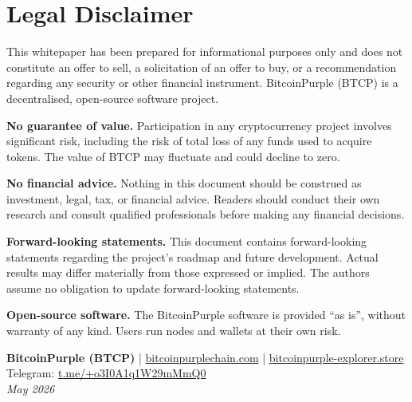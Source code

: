 \documentclass[12pt, a4paper]{article}
\begin{document}
\section{Legal Disclaimer}

This whitepaper has been prepared for informational purposes only and does not
constitute an offer to sell, a solicitation of an offer to buy, or a
recommendation regarding any security or other financial instrument.
BitcoinPurple (BTCP) is a decentralised, open-source software project.

\textbf{No guarantee of value.}  Participation in any cryptocurrency project
involves significant risk, including the risk of total loss of any funds used
to acquire tokens.  The value of BTCP may fluctuate and could decline to zero.

\textbf{No financial advice.}  Nothing in this document should be construed as
investment, legal, tax, or financial advice.  Readers should conduct their own
research and consult qualified professionals before making any financial
decisions.

\textbf{Forward-looking statements.}  This document contains forward-looking
statements regarding the project's roadmap and future development.  Actual
results may differ materially from those expressed or implied.  The authors
assume no obligation to update forward-looking statements.

\textbf{Open-source software.}  The BitcoinPurple software is provided ``as
is'', without warranty of any kind.  Users run nodes and wallets at their own
risk.

\vfill
\begin{center}
{\small
\textbf{BitcoinPurple (BTCP)} \quad|\quad
\href{https://bitcoinpurplechain.com/}{bitcoinpurplechain.com} \quad|\quad
\href{https://bitcoinpurple-explorer.store/}{bitcoinpurple-explorer.store}\\[4pt]
Telegram: \href{https://t.me/+o3I0A1q1W29mMmQ0}{t.me/+o3I0A1q1W29mMmQ0}\\[8pt]
\textit{May 2026}
}
\end{center}
\end{document}
